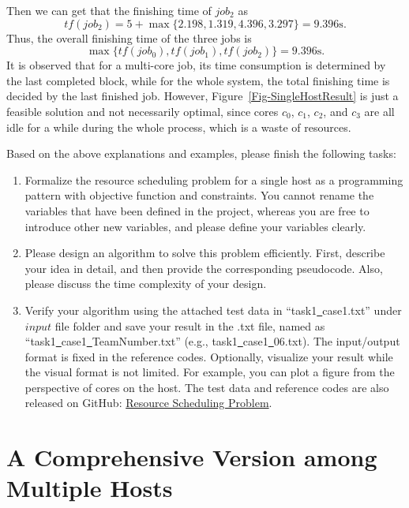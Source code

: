 \documentclass{llncs}
\begin{document}
Then we can get that the finishing time of $job_2$ as $$tf(job_2) = 5 + \max\{ 2.198, 1.319, 4.396, 3.297\} = 9.396\text{s}.$$ Thus, the overall finishing time of the three jobs is $$\max\{tf(job_0), tf(job_1), tf(job_2) \} = 9.396\text{s}.$$ It is observed that for a multi-core job, its time consumption is determined by the last completed block, while for the whole system, the total finishing time is decided by the last finished job. However, Figure~\ref{Fig-SingleHostResult} is just a feasible solution and not necessarily optimal, since cores $c_0$, $c_1$, $c_2$, and $c_3$ are all idle for a while during the whole process, which is a waste of resources.

\vspace{2mm}

Based on the above explanations and examples, please finish the following tasks:
\begin{enumerate}
  \vspace{-1mm}
  \item Formalize the resource scheduling problem for a single host as a programming pattern with objective function and constraints. You cannot rename the variables that have been defined in the project, whereas you are free to introduce other new variables, and please define your variables clearly.

  \item Please design an algorithm to solve this problem efficiently. First, describe your idea in detail, and then provide the corresponding pseudocode. Also, please discuss the time complexity of your design.
  \item Verify your algorithm using the attached test data in ``task1\underline\ case1.txt'' under $input$ file folder and save your result in the .txt file, named as ``task1\underline\ case1\underline\ TeamNumber.txt'' (e.g., task1\underline\ case1\underline\ 06.txt). The input/output format is fixed in the reference codes. Optionally, visualize your result while the visual format is not limited. For example, you can plot a figure from the perspective of cores on the host. The test data and reference codes are also released on GitHub: \href{https://github.com/shiwanghua/SharedFiles/tree/Project-CodeDemo}{Resource Scheduling Problem}.
\end{enumerate}

\section{A Comprehensive Version among Multiple Hosts}
\label{sec-problem2}
\end{document}
